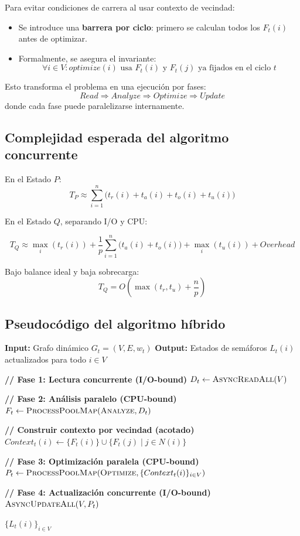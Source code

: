 \documentclass[12pt]{article}
\begin{document}
Para evitar condiciones de carrera al usar contexto de vecindad:

\begin{itemize}
\item Se introduce una \textbf{barrera por ciclo}: primero se calculan todos los \(F_t(i)\) antes de optimizar.
\item Formalmente, se asegura el invariante:
\[
\forall i\in V: optimize(i) \text{ usa } F_t(i) \text{ y } F_t(j) \text{ ya fijados en el ciclo } t
\]
\end{itemize}

Esto transforma el problema en una ejecución por fases:
\[
Read \Rightarrow Analyze \Rightarrow Optimize \Rightarrow Update
\]
donde cada fase puede paralelizarse internamente.

\subsection{Complejidad esperada del algoritmo concurrente}

En el Estado \(P\):
\[
T_P \approx \sum_{i=1}^n \big(t_r(i)+t_a(i)+t_o(i)+t_u(i)\big)
\]

En el Estado \(Q\), separando I/O y CPU:

\[
T_Q \approx \max_i(t_r(i)) + 
\frac{1}{p}\sum_{i=1}^n \big(t_a(i)+t_o(i)\big) + 
\max_i(t_u(i)) + Overhead
\]

Bajo balance ideal y baja sobrecarga:
\[
T_Q = O\left(\max(t_r,t_u) + \frac{n}{p}\right)
\]

\subsection{Pseudocódigo del algoritmo híbrido}

\begin{algorithm}[H]
\caption{Ciclo de control concurrente (AsyncIO + Multiprocessing)}
\begin{algorithmic}[1]
\State \textbf{Input:} Grafo dinámico \(G_t=(V,E,w_t)\)
\State \textbf{Output:} Estados de semáforos \(L_t(i)\) actualizados para todo \(i\in V\)

\Statex
\State \textbf{// Fase 1: Lectura concurrente (I/O-bound)}
\State \(D_t \gets \textsc{AsyncReadAll}(V)\)

\Statex
\State \textbf{// Fase 2: Análisis paralelo (CPU-bound)}
\State \(F_t \gets \textsc{ProcessPoolMap}(\textsc{Analyze}, D_t)\)

\Statex
\State \textbf{// Construir contexto por vecindad (acotado)}
\State \(Context_t(i) \gets \{F_t(i)\} \cup \{F_t(j)\mid j\in N(i)\}\)
\EndFor

\Statex
\State \textbf{// Fase 3: Optimización paralela (CPU-bound)}
\State \(P_t \gets \textsc{ProcessPoolMap}(\textsc{Optimize}, \{Context_t(i)\}_{i\in V})\)

\Statex
\State \textbf{// Fase 4: Actualización concurrente (I/O-bound)}
\State \(\textsc{AsyncUpdateAll}(V, P_t)\)

\State \Return \(\{L_t(i)\}_{i\in V}\)
\end{algorithmic}
\end{algorithm}
\end{document}
